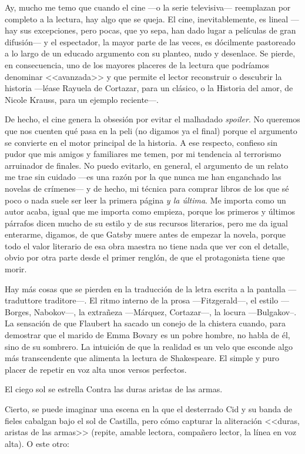Ay, mucho me temo que cuando el cine ---o la serie televisiva--- reemplazan por completo a la lectura, hay algo que se queja. El cine, inevitablemente, es lineal ---hay sus excepciones, pero pocas, que yo sepa, han dado lugar a películas de gran difusión--- y el espectador, la mayor parte de las veces, es dócilmente pastoreado a lo largo de un educado argumento con su planteo, nudo y desenlace. Se pierde, en consecuencia, uno de los mayores placeres de la lectura que podríamos denominar <<avanzada>> y que permite el lector reconstruir o descubrir la historia ---léase Rayuela de Cortazar, para un clásico, o la Historia del amor, de Nicole Krauss, para un ejemplo reciente---. 

De hecho, el cine genera la obsesión por evitar el malhadado \emph{spoiler}. No queremos que nos cuenten qué pasa en la peli (no digamos ya el final) porque el argumento se convierte en el motor principal de la historia. A ese respecto, confieso sin pudor que mis amigos y familiares me temen, por mi tendencia al terrorismo arruinador de finales. No puedo evitarlo, en general, el argumento de un relato me trae sin cuidado ---es una razón por la que nunca me han enganchado las novelas de crímenes--- y de hecho, mi técnica para comprar libros de los que sé poco o nada suele ser leer la primera página \emph{y la última}. Me importa como un autor acaba, igual que me importa como empieza, porque los primeros y últimos párrafos dicen mucho de su estilo y de sus recursos literarios, pero me da igual enterarme, digamos, de que Gatsby muere antes de empezar la novela, porque todo el valor literario de esa obra maestra no tiene nada que ver con el detalle, obvio por otra parte desde el primer renglón, de que el protagonista tiene que morir. 

Hay más cosas que se pierden en la traducción de la letra escrita a la pantalla ---traduttore traditore---. El ritmo interno de la prosa ---Fitzgerald---, el estilo ---Borges, Nabokov---, la extrañeza ---Márquez, Cortazar---, la locura ---Bulgakov--. La sensación de que Flaubert ha sacado un conejo de la chistera cuando, para demostrar que el marido de Emma Bovary es un pobre hombre, no habla de él, sino de su sombrero. La intuición de que la realidad es un velo que esconde algo más transcendente que alimenta la lectura de Shakespeare. El simple y puro placer de repetir en voz alta unos versos perfectos. 

El ciego sol se estrella
Contra las duras aristas de las armas.

Cierto, se puede imaginar una escena en la que el desterrado Cid y su banda de fieles cabalgan bajo el sol de Castilla, pero cómo capturar la aliteración <<duras, aristas de las armas>> (repite, amable lectora, compañero lector, la línea en voz alta). O este otro:

